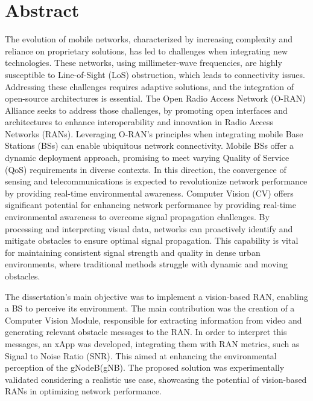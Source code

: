 
\chapter*{Abstract}
The evolution of mobile networks, characterized by increasing complexity and reliance on proprietary solutions, has led to challenges when integrating new technologies.
These networks, using millimeter-wave frequencies, are highly susceptible to Line-of-Sight (LoS) obstruction, which leads to connectivity issues.
Addressing these challenges requires adaptive solutions, and the integration of open-source architectures is essential.
The Open Radio Access Network (O-RAN) Alliance seeks to address those challenges, by promoting open interfaces and architectures to enhance interoperability and innovation in Radio Access Networks (RANs).
Leveraging O-RAN's principles when integrating mobile Base Stations (BSs) can enable ubiquitous network connectivity.
Mobile BSs offer a dynamic deployment approach, promising to meet varying Quality of Service (QoS) requirements in diverse contexts.
In this direction, the convergence of sensing and telecommunications is expected to revolutionize network performance by providing real-time environmental awareness.
Computer Vision (CV) offers significant potential for enhancing network performance by providing real-time environmental awareness to overcome signal propagation challenges.
By processing and interpreting visual data, networks can proactively identify and mitigate obstacles to ensure optimal signal propagation.
This capability is vital for maintaining consistent signal strength and quality in dense urban environments, where traditional methods struggle with dynamic and moving obstacles.

The dissertation's main objective was to implement a vision-based RAN, enabling a BS to perceive its environment.
The main contribution was the creation of a Computer Vision Module, responsible for extracting information from video and generating relevant obstacle messages to the RAN\@.
In order to interpret this messages, an xApp was developed, integrating them with RAN metrics, such as Signal to Noise Ratio (SNR). This aimed at enhancing the environmental perception of the gNodeB(gNB).
The proposed solution was experimentally validated considering a realistic use case, showcasing the potential of vision-based RANs in optimizing network performance.